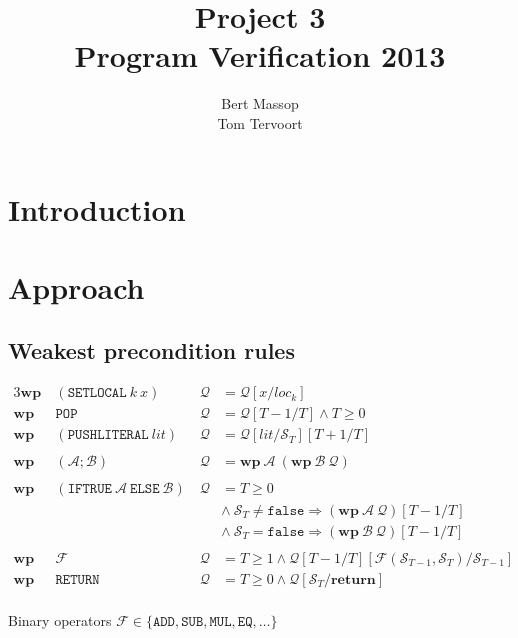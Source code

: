 \documentclass[a4paper]{article}
\title{Project 3\\\large\sc Program Verification 2013}
\author{Bert Massop\\Tom Tervoort}
\begin{document}
\maketitle

\section{Introduction}

\section{Approach}

\subsection{Weakest precondition rules}

\newcommand{\Q}{\mathcal{Q}}
\newcommand{\A}{\mathcal{A}}
\newcommand{\B}{\mathcal{B}}
\renewcommand{\wp}{\mathbf{wp}}
\newcommand{\stack}[1]{\mathcal{S}_{#1}}

\begin{alignat*}{3}
\wp\ &(\mathtt{SETLOCAL}\ k\ x)\ &\Q &= \Q[x / loc_k]\\
\wp\ &\mathtt{POP}\ &\Q &= \Q[T - 1 / T] \wedge T \geq 0\\
\wp\ &(\mathtt{PUSHLITERAL}\ lit)\ &\Q &= \Q[lit / \stack{T}][T + 1 / T]\\\\
\wp\ &(\A; \B)\ &\Q &= \wp\ \A\ (\wp\ \B\ \Q)\\\\
\wp\ &(\mathtt{IFTRUE}\ \A\ \mathtt{ELSE}\ \B)\ &\Q &= T \geq 0\\
&&&\wedge\ \stack{T} \neq \mathtt{false} \Rightarrow (\wp\ \A\ \Q)[T - 1 / T]\\
&&&\wedge\ \stack{T} = \mathtt{false} \Rightarrow (\wp\ \B\ \Q)[T - 1 / T]\\\\
\wp\ &\mathcal{F}\ &\Q &= T \geq 1 \wedge \Q[T - 1 / T][\mathcal{F}(\stack{T-1}, \stack{T}) / \stack{T-1}]\\
\wp\ &\mathtt{RETURN}\ &\Q &= T \geq 0 \wedge \Q[\stack{T} / \mathbf{return}]\\
\end{alignat*}

Binary operators $\mathcal{F} \in \{\mathtt{ADD}, \mathtt{SUB}, \mathtt{MUL}, \mathtt{EQ}, \ldots\}$
\end{document}
